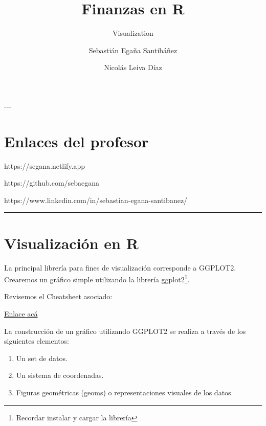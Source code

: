 \documentclass[
  letterpaper,
  DIV=11,
  numbers=noendperiod]{scrartcl}
\title{Finanzas en R}
\subtitle{Visualization}
\author{Sebastián Egaña Santibáñez
\href{mailto:segana@fen.uchile}{} \and Nicolás Leiva Díaz
\href{mailto:nleivad@fen.uchile.cl}{}}
\date{}
\providecommand{\tightlist}{%
  \setlength{\itemsep}{0pt}\setlength{\parskip}{0pt}}\usepackage{longtable,booktabs,array}
\begin{document}
\maketitle
\ifdefined\Shaded\renewenvironment{Shaded}{\begin{tcolorbox}[interior hidden, boxrule=0pt, enhanced, sharp corners, breakable, borderline west={3pt}{0pt}{shadecolor}, frame hidden]}{\end{tcolorbox}}\fi

-\/-\/-

\hypertarget{enlaces-del-profesor}{%
\section{Enlaces del profesor}\label{enlaces-del-profesor}}

\href{https://segana.netlify.app}{} https://segana.netlify.app

\href{https://github.com/sebaegana}{} https://github.com/sebaegana

\href{https://www.linkedin.com/in/sebastian-egana-santibanez/}{}
https://www.linkedin.com/in/sebastian-egana-santibanez/

\begin{center}\rule{0.5\linewidth}{0.5pt}\end{center}

\hypertarget{visualizaciuxf3n-en-r}{%
\section{Visualización en R}\label{visualizaciuxf3n-en-r}}

La principal librería para fines de visualización corresponde a GGPLOT2.
Crearemos un gráfico simple utilizando la librería ggplot2\footnote{Recordar
  instalar y cargar la librería}.

Revisemos el Cheatsheet asociado:

\href{https://github.com/rstudio/cheatsheets/blob/master/data-visualization-2.1.pdf}{Enlace acá}

La construcción de un gráfico utilizando GGPLOT2 se realiza a través de
los siguientes elementos:

\begin{enumerate}
\def\labelenumi{\arabic{enumi}.}
\tightlist
\item
  Un set de datos.
\item
  Un sistema de coordenadas.
\item
  Figuras geométricas (geoms) o representaciones visuales de los datos.
\end{enumerate}
\end{document}
